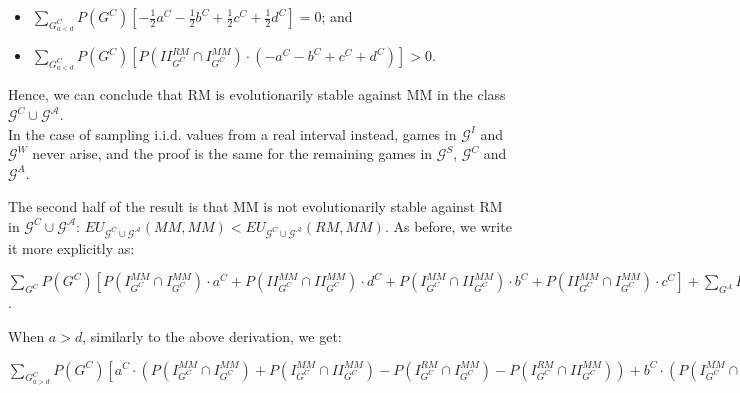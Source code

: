\documentclass[fleqn,reqno,11pt]{article}
\begin{document}
\begin{itemize}

\item[(1)] $\sum_{G_{a<d}^{C}} P(G^{C})[-\frac{1}{2}a^{C}- \frac{1}{2}b^{C} + \frac{1}{2}c^{C} + \frac{1}{2}d^{C}]= 0$; and

\item[(2)] $\sum_{G_{a<d}^{C}} P(G^{C})[P(II_{G^{C}}^{RM}\cap I_{G^{C}}^{MM})\cdot (-a^{C} - b^{C} + c^{C} + d^{C})]> 0$.

\end{itemize}


\noindent Hence, we can conclude that RM is evolutionarily stable against MM in the class $\mathcal{G}^{C}\cup\mathcal{G^{A}}$. \\
In the case of sampling i.i.d. values from a real interval instead, games in $\mathcal{G}^I $ and $\mathcal{G}^W $ never arise, and the proof is the same for the remaining games in $\mathcal{G}^S $,  $\mathcal{G}^C $ and $\mathcal{G}^A $.

\medskip{}

The second half of the result is that MM is not evolutionarily stable
against RM in $\mathcal{G}^{C}\cup\mathcal{G^{A}}$: $EU_{\mathcal{G}^{C}\cup\mathcal{G^{A}}}(MM,MM)<EU_{\mathcal{G}^{C}\cup\mathcal{G^{A}}}(RM,MM)$.
As before, we write it more explicitly as:

\medskip{}


\noindent $\sum_{G^{C}}P(G^{C})[P(I_{G^{C}}^{MM}\cap I_{G^{C}}^{MM})\cdot a^{C}+P(II_{G^{C}}^{MM}\cap II_{G^{C}}^{MM})\cdot d^{C}+P(I_{G^{C}}^{MM}\cap II_{G^{C}}^{MM})\cdot b^{C}+P(II_{G^{C}}^{MM}\cap I_{G^{C}}^{MM})\cdot c^{C}]+\sum_{G^{A}}P(G^{A})[P(I_{G^{A}}^{MM}\cap I_{G^{A}}^{MM})\cdot a^{A}+P(II_{G^{A}}^{MM}\cap II_{G^{A}}^{MM})\cdot d^{A}+P(I_{G^{A}}^{MM}\cap II_{G^{A}}^{MM})\cdot b^{A}+P(II_{G^{A}}^{MM}\cap I_{G^{A}}^{MM})\cdot c^{A}] < \sum_{G^{C}}P(G^{C})[P(I_{G^{C}}^{RM}\cap I_{G^{C}}^{MM})\cdot a^{C}+P(II_{G^{C}}^{RM}\cap II_{G^{C}}^{MM})\cdot d^{C}+P(I_{G^{C}}^{RM}\cap II_{G^{C}}^{MM})\cdot b^{C}+P(II_{G^{C}}^{RM}\cap I_{G^{C}}^{MM})\cdot c^{C}]+\sum_{G^{A}}P(G^{A})[P(I_{G^{A}}^{RM}\cap I_{G^{A}}^{MM})\cdot a^{A}+P(II_{G^{A}}^{RM}\cap II_{G^{A}}^{MM})\cdot d^{A}+P(I_{G^{A}}^{RM}\cap II_{G^{A}}^{MM})\cdot b^{A}+P(II_{G^{A}}^{RM}\cap I_{G^{A}}^{MM})\cdot c^{A}]$.
\medskip{}

\noindent When $a>d$, similarly to the above derivation, we get: 

\medskip{}
\noindent $\sum_{G_{a>d}^{C}} P(G^{C})[a^{C} \cdot (P(I_{G^{C}}^{MM}\cap I_{G^{C}}^{MM}) + P(I_{G^{C}}^{MM}\cap II_{G^{C}}^{MM})- P(I_{G^{C}}^{RM}\cap I_{G^{C}}^{MM}) - P(I_{G^{C}}^{RM}\cap II_{G^{C}}^{MM})) + b^{C} \cdot  (P(I_{G^{C}}^{MM}\cap I_{G^{C}}^{MM}) + P(I_{G^{C}}^{MM}\cap II_{G^{C}}^{MM})- P(I_{G^{C}}^{RM}\cap I_{G^{C}}^{MM}) - P(I_{G^{C}}^{RM}\cap II_{G^{C}}^{MM})) + c^{C} \cdot (P(II_{G^{C}}^{MM}\cap I_{G^{C}}^{MM}) +P(II_{G^{C}}^{MM}\cap II_{G^{C}}^{MM})- P(II_{G^{C}}^{RM}\cap II_{G^{C}}^{MM})) + d^{C} \cdot (P(II_{G^{C}}^{MM}\cap II_{G^{C}}^{MM})+P(II_{G^{C}}^{MM}\cap I_{G^{C}}^{MM})- P(II_{G^{C}}^{RM}\cap II_{G^{C}}^{MM}))]< 0$
\medskip{}
\end{document}
